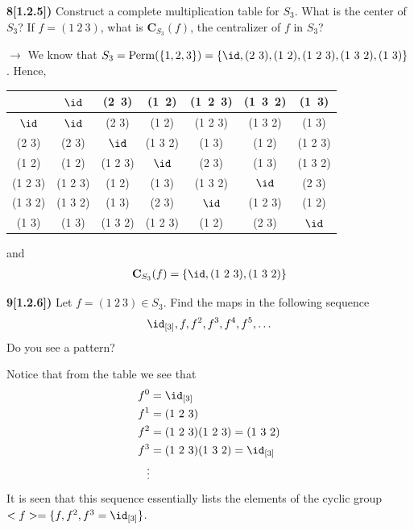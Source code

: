 \documentclass[12pt,a4paper]{article}
\newcommand{\prob}[2]{\textbf{#1)} #2}
\begin{document}
\prob{8[1.2.5]}{Construct a complete multiplication table for $S_3$. What is the center of $S_3$? If $f = (1~2~3)$, what is $\mathbf{C}_{S_3}(f)$, the centralizer of $f$ in $S_3$?}

$\rightarrow$ We know that $S_3 = {\rm Perm}(\{1,2,3\}) = \{\id,(2~3),(1~2),(1~2~3),(1~3~2),(1~3)\}$. Hence,
\begin{table}[H]
 \begin{center}
  \begin{tabular}{c|cccccc}
   & $\id$ & (2~3) & (1~2) & (1~2~3) & (1~3~2) & (1~3) \\
  \hline
  $\id$ & $\id$ & (2 3) & (1 2) & (1 2 3) & (1 3 2) & (1 3) \\
  (2 3) & (2 3) & $\id$ & (1 3 2) & (1 3) & (1 2) & (1 2 3) \\
  (1 2) & (1 2) & (1 2 3) & $\id$ & (2 3) & (1 3) & (1 3 2) \\
  (1 2 3) & (1 2 3) & (1 2) & (1 3) & (1 3 2) & $\id$ & (2 3) \\
  (1 3 2) & (1 3 2) & (1 3) & (2 3) & $\id$ & (1 2 3) & (1 2) \\
  (1 3) & (1 3) & (1 3 2) & (1 2 3) & (1 2) & (2 3) & $\id$ \\
  \end{tabular}
 \end{center}
\end{table}

and 
\begin{align*}
\mathbf{C}_{S_3}(f) = \{\id,(1~2~3),(1~3~2)\}
\end{align*}

\prob{9[1.2.6]}{Let $f = (1~2~3) \in S_3$. Find the maps in the following sequence
\begin{align*}
\id_{[3]},f,f^2,f^3,f^4,f^5,\hdots
\end{align*}
Do you see a pattern?}

Notice that from the table we see that
\begin{align*}
f^{0} &= \id_{[3]} \\
f^{1} &= (1~2~3) \\
f^{2} &= (1~2~3)(1~2~3) = (1~3~2) \\
f^{3} &= (1~2~3)(1~3~2) = \id_{[3]} \\
\vdots
\end{align*}
It is seen that this sequence essentially lists the elements of the cyclic group $<f> = \{f,f^2,f^3=\id_{[3]}\}$.
\end{document}
